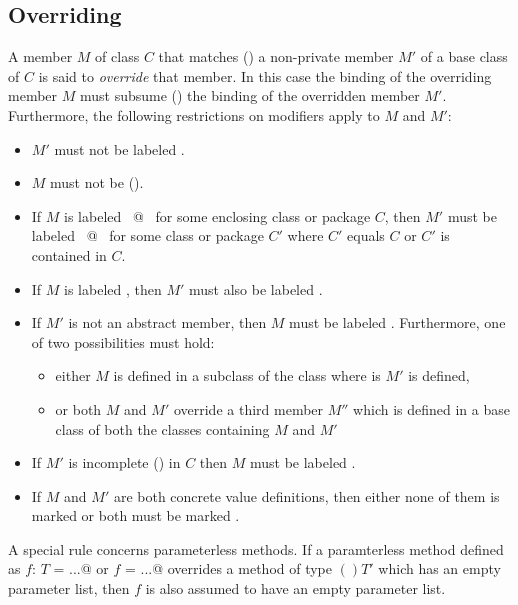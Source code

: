 \subsection{Overriding}
\label{sec:overriding}


A member $M$ of class $C$ that matches () 
a non-private member $M'$ of a
base class of $C$ is said to {\em override} that member.  In this case
the binding of the overriding member $M$ must subsume
() the binding of the overridden member $M'$.
Furthermore, the following restrictions on modifiers apply to $M$ and
$M'$:
\begin{itemize}
\item
$M'$ must not be labeled .
\item
$M$ must not be  ().
\item
If $M$ is labeled ~\lstinline@private[$C$]@~ for some enclosing class or package $C$,
then $M'$ must be labeled ~\lstinline@private[$C'$]@~ for some class or package $C'$ where
$C'$ equals $C$ or $C'$ is contained in $C$.
\item
If $M$ is labeled , then $M'$ must also be
labeled .
\item
If $M'$ is not an abstract member, then
$M$ must be labeled .
Furthermore, one of two possibilities must hold:
\begin{itemize}
\item either $M$ is defined in a subclass of the class where is $M'$ is defined, 
\item or both $M$ and $M'$ override a third member $M''$ which is defined
      in a base class of both the classes containing $M$ and $M'$ 
\end{itemize}
\item
If $M'$ is incomplete () in $C$ then $M$ must be
labeled .
\item 
If $M$ and $M'$ are both concrete value definitions, then either none
of them is marked  or both must be marked .
\end{itemize}
A special rule concerns parameterless methods. If a paramterless
method defined as \lstinline@def $f$: $T$ = ...@ or 
\lstinline@def $f$ = ...@ overrides a method of
type $()T'$ which has an empty parameter list, then $f$ is also
assumed to have an empty parameter list.

